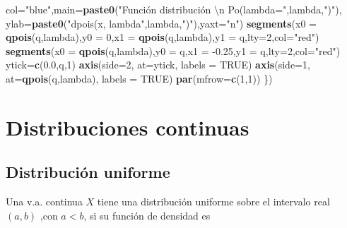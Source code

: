 \documentclass[]{book}
\newenvironment{Shaded}{\begin{snugshade}}{\end{snugshade}}
\newcommand{\CharTok}[1]{\textcolor[rgb]{0.31,0.60,0.02}{#1}}
\newcommand{\DataTypeTok}[1]{\textcolor[rgb]{0.13,0.29,0.53}{#1}}
\newcommand{\DecValTok}[1]{\textcolor[rgb]{0.00,0.00,0.81}{#1}}
\newcommand{\FloatTok}[1]{\textcolor[rgb]{0.00,0.00,0.81}{#1}}
\newcommand{\KeywordTok}[1]{\textcolor[rgb]{0.13,0.29,0.53}{\textbf{#1}}}
\newcommand{\NormalTok}[1]{#1}
\newcommand{\OtherTok}[1]{\textcolor[rgb]{0.56,0.35,0.01}{#1}}
\newcommand{\StringTok}[1]{\textcolor[rgb]{0.31,0.60,0.02}{#1}}
\begin{document}
\begin{Shaded}
\begin{Highlighting}[]
        \DataTypeTok{col=}\StringTok{"blue"}\NormalTok{,}\DataTypeTok{main=}\KeywordTok{paste0}\NormalTok{(}\StringTok{"Función distribución }\CharTok{\textbackslash{}n}\StringTok{ Po(lambda="}\NormalTok{,lambda,}\StringTok{")"}\NormalTok{),}
        \DataTypeTok{ylab=}\KeywordTok{paste0}\NormalTok{(}\StringTok{"dpois(x, lambda"}\NormalTok{,lambda,}\StringTok{")"}\NormalTok{),}\DataTypeTok{yaxt=}\StringTok{"n"}\NormalTok{)}
  \KeywordTok{segments}\NormalTok{(}\DataTypeTok{x0 =} \KeywordTok{qpois}\NormalTok{(q,lambda),}\DataTypeTok{y0 =} \DecValTok{0}\NormalTok{,}\DataTypeTok{x1 =} \KeywordTok{qpois}\NormalTok{(q,lambda),}\DataTypeTok{y1 =}\NormalTok{ q,}\DataTypeTok{lty=}\DecValTok{2}\NormalTok{,}\DataTypeTok{col=}\StringTok{"red"}\NormalTok{)}
  \KeywordTok{segments}\NormalTok{(}\DataTypeTok{x0 =} \KeywordTok{qpois}\NormalTok{(q,lambda),}\DataTypeTok{y0 =}\NormalTok{ q,}\DataTypeTok{x1 =} \FloatTok{-0.25}\NormalTok{,}\DataTypeTok{y1 =}\NormalTok{ q,}\DataTypeTok{lty=}\DecValTok{2}\NormalTok{,}\DataTypeTok{col=}\StringTok{"red"}\NormalTok{)}
\NormalTok{  ytick=}\KeywordTok{c}\NormalTok{(}\FloatTok{0.0}\NormalTok{,q,}\DecValTok{1}\NormalTok{)}
  \KeywordTok{axis}\NormalTok{(}\DataTypeTok{side=}\DecValTok{2}\NormalTok{, }\DataTypeTok{at=}\NormalTok{ytick, }\DataTypeTok{labels =} \OtherTok{TRUE}\NormalTok{)}
  \KeywordTok{axis}\NormalTok{(}\DataTypeTok{side=}\DecValTok{1}\NormalTok{, }\DataTypeTok{at=}\KeywordTok{qpois}\NormalTok{(q,lambda), }\DataTypeTok{labels =} \OtherTok{TRUE}\NormalTok{)}
  \KeywordTok{par}\NormalTok{(}\DataTypeTok{mfrow=}\KeywordTok{c}\NormalTok{(}\DecValTok{1}\NormalTok{,}\DecValTok{1}\NormalTok{))}
\NormalTok{\})}
\end{Highlighting}
\end{Shaded}

\hypertarget{distribuciones-continuas}{%
\section{Distribuciones continuas}\label{distribuciones-continuas}}

\hypertarget{distribuciuxf3n-uniforme}{%
\subsection{Distribución uniforme}\label{distribuciuxf3n-uniforme}}

Una v.a. continua \(X\) tiene una distribución uniforme sobre el intervalo real \((a,b)\) ,con \(a<b\), si su función de densidad es
\end{document}
